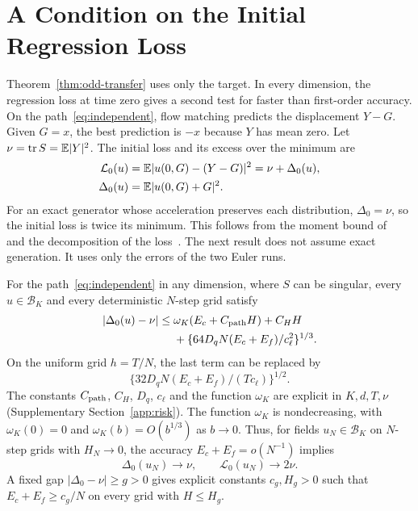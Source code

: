 \section{A Condition on the Initial Regression Loss}
\label{sec:risk}
Theorem~\ref{thm:odd-transfer} uses only the target. In every dimension,
the regression loss at time zero gives a second test for faster than
first-order accuracy. On the path~\eqref{eq:independent}, flow matching
predicts the displacement $Y-G$. Given $G=x$, the best prediction is
$-x$ because $Y$ has mean zero. Let $\nu=\operatorname{tr} S=\mathbb E|Y|^2$. The initial
loss and its excess over the minimum are\AIassistance
\begin{align}
 \mathcal L_0(u)&=\mathbb E|u(0,G)-(Y-G)|^2=\nu+\Delta_0(u),\label{eq:loss}\\
 \Delta_0(u)&=\mathbb E|u(0,G)+G|^2.\notag
\end{align}
For an exact generator whose acceleration preserves each distribution,
$\Delta_0=\nu$, so the initial loss is twice its minimum. This follows
from the moment bound of~\citep[Proposition~30]{obzherin2026finite} and
the decomposition of the loss~\citep{mei2026ambiguity}. The next result
does not assume exact generation. It uses only the errors of the two
Euler runs.

\begin{theorem}\label{thm:source-risk}
For the path~\eqref{eq:independent} in any dimension, where $S$ can be
singular, every $u\in\mathcal B_K$ and every deterministic
$N$-step grid satisfy
\begin{equation}\label{eq:risk-main}
\begin{split}
 |\Delta_0(u)-\nu|\le{}&\omega_K(E_c+C_{\rm path}H)+C_HH\\
 &+\{64D_qN(E_c+E_f)/c_\ell^2\}^{1/3}.
\end{split}
\end{equation}
On the uniform grid $h=T/N$, the last term can be replaced by
\begin{equation}\label{eq:risk-uniform}
 \{32D_qN(E_c+E_f)/(Tc_\ell)\}^{1/2}.
\end{equation}
The constants $C_{\rm path}$, $C_H$, $D_q$, $c_\ell$ and the function
$\omega_K$ are explicit in $K,d,T,\nu$ (Supplementary
Section~\ref{app:risk}). The function $\omega_K$ is nondecreasing, with
$\omega_K(0)=0$ and $\omega_K(b)=O(b^{1/3})$ as $b\to0$. Thus, for fields $u_N\in\mathcal B_K$ on $N$-step grids with
$H_N\to0$, the accuracy $E_c+E_f=o(N^{-1})$ implies
\begin{equation}\label{eq:loss-limit}
 \Delta_0(u_N)\to\nu,\qquad\mathcal L_0(u_N)\to2\nu.
\end{equation}
A fixed gap $|\Delta_0-\nu|\ge g>0$ gives explicit constants
$c_g,H_g>0$ such that $E_c+E_f\ge c_g/N$ on every grid with $H\le H_g$.
\end{theorem}

